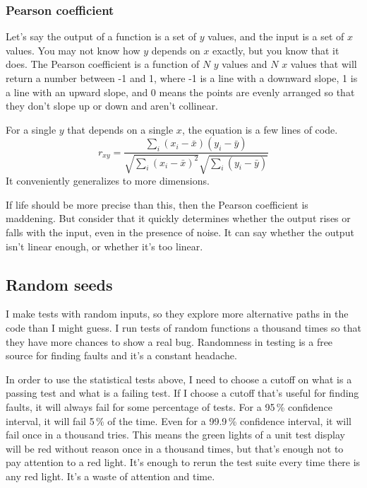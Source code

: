 \documentclass[fleqn,10pt]{olplainarticle}
\begin{document}
\subsubsection{Pearson coefficient}
Let's say the output of a function is a set of $y$ values,
and the input is a set of $x$ values. You may not know
how $y$ depends on $x$ exactly, but you know that it
does. The Pearson coefficient is a function of
$N$ $y$ values and $N$ $x$ values that will return a number
between -1 and 1, where -1 is a line with a downward slope,
1 is a line with an upward slope, and 0 means the points
are evenly arranged so that they don't slope up or down
and aren't collinear.

For a single $y$ that depends on a single $x$, the equation
is a few lines of code.
\begin{equation}
r_{xy} = \frac{\sum_i (x_i - \bar{x})(y_i - \bar{y})}{\sqrt{\sum_i (x_i - \bar{x})^2}\sqrt{\sum_i(y_i - \bar{y})}}
\end{equation}
It conveniently generalizes to more dimensions.

If life should be more precise than this, then the Pearson
coefficient is maddening. But consider that it quickly
determines whether the output rises or falls with the input,
even in the presence of noise. It can say whether the output
isn't linear enough, or whether it's too linear.


\subsection{Random seeds}

I make tests with random inputs, so they explore more alternative
paths in the code than I might guess. I run tests of random
functions a thousand times so that they have more chances to
show a real bug. Randomness in testing is a free source for
finding faults and it's a constant headache.

In order to use the statistical tests above, I need to choose
a cutoff on what is a passing test and what is a failing test.
If I choose a cutoff that's useful for finding faults, it will
always fail for some percentage of tests. For a 95\,\% confidence
interval, it will fail 5\,\% of the time. Even for a
99.9\,\% confidence interval, it will fail once in a thousand
tries. This means the green lights of a unit test display will
be red without reason once in a thousand times, but that's
enough not to pay attention to a red light. It's enough to
rerun the test suite every time there is any red light.
It's a waste of attention and time.
\end{document}
